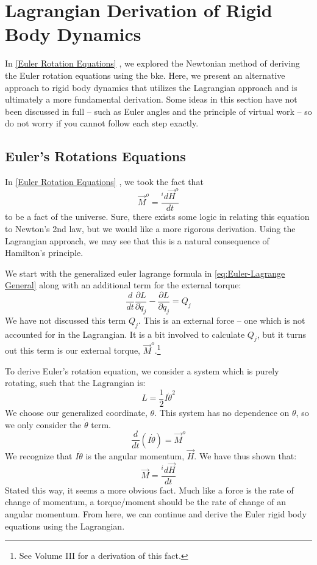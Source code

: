 \documentclass[10pt, openany, titlepage]{book}
\theoremstyle{definition}
\let\oldautoref\autoref
\renewcommand{\autoref}[1]{%
  \begingroup
  \hypersetup{linkcolor=black}%
  \oldautoref{#1}%
  \endgroup
}
\begin{document}
\section{Lagrangian Derivation of Rigid Body Dynamics}

In \autoref{Euler Rotation Equations}, we explored the Newtonian method of deriving the Euler rotation equations using the \gls{bke}. Here, we present an alternative approach to rigid body dynamics that utilizes the \gls{Lagrangian} approach and is ultimately a more fundamental derivation. Some ideas in this section have not been discussed in full -- such as Euler angles and the principle of virtual work -- so do not worry if you cannot follow each step exactly.

\subsection{Euler's Rotations Equations}\label{sec: euler rot eq}
In \autoref{Euler Rotation Equations}, we took the fact that
$$\vec{M}^o=\frac{{}^id\vec{H}^o}{dt}$$
to be a fact of the universe. Sure, there exists some logic in relating this equation to Newton's 2nd law, but we would like a more rigorous derivation. Using the \gls{Lagrangian} approach, we may see that this is a natural consequence of Hamilton's principle.

We start with the generalized \gls{euler lagrange} formula in \eqref{eq:Euler-Lagrange General} along with an additional term for the external torque:
$$\frac{d}{dt}\frac{\partial L}{\partial \dot{q}_j}-\frac{\partial L}{\partial q_j}=Q_j$$
We have not discussed this term $Q_j$. This is an external force -- one which is not accounted for in the \gls{Lagrangian}. It is a bit involved to calculate $Q_j$, but it turns out this term is our external torque, $\vec{M}^o$.\footnote{See Volume III for a derivation of this fact.}

To derive Euler's rotation equation, we consider a system which is purely rotating, such that the \gls{Lagrangian} is:
$$L=\frac{1}{2}I\dot{\theta}^2$$
We choose our \gls{generalized coordinate}, $\theta$. This system has no dependence on $\theta$, so we only consider the $\dot{\theta}$ term.
$$\frac{d}{dt}(I\dot{\theta})=\vec{M}^o$$
We recognize that $I\dot{\theta}$ is the angular momentum, $\vec{H}$. We have thus shown that:
$$\vec{M}=\frac{^id\vec{H}}{dt}$$
Stated this way, it seems a more obvious fact. Much like a force is the rate of change of momentum, a torque/moment should be the rate of change of an angular momentum. From here, we can continue and derive the Euler rigid body equations using the \gls{Lagrangian}. 
\end{document}
